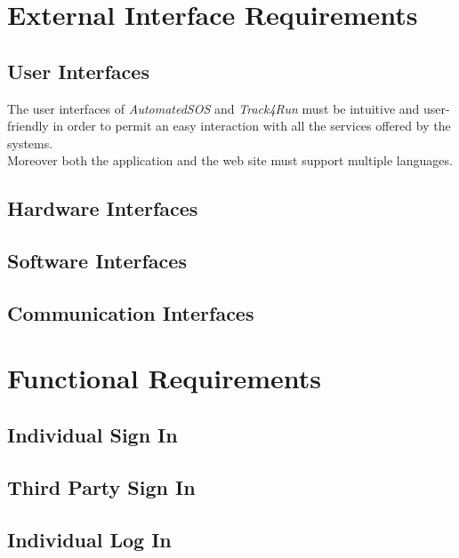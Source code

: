 \section{External Interface Requirements}

\subsection{User Interfaces}
The user interfaces of \textit{AutomatedSOS} and \textit{Track4Run} must be intuitive and user-friendly in order to permit an easy interaction with all the services offered by the systems.\\
Moreover both the application and the web site must support multiple languages.

\subsection{Hardware Interfaces}

\subsection{Software Interfaces}

\subsection{Communication Interfaces}

\clearpage
\section{Functional Requirements}

\subsection{Individual Sign In}

\clearpage

\subsection{Third Party Sign In}

\clearpage

\subsection{Individual Log In}

\clearpage

